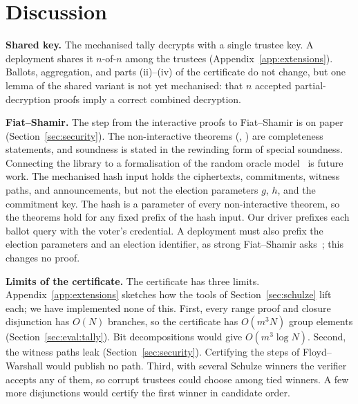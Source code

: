 \section{Discussion}\label{sec:discussion}

\textbf{Shared key.} The mechanised tally decrypts with a single trustee
key. A deployment shares it $n$-of-$n$ among the trustees
(Appendix~\ref{app:extensions}). Ballots, aggregation, and parts
(ii)--(iv) of the certificate do not change, but one lemma of the shared
variant is not yet mechanised: that $n$ accepted partial-decryption
proofs imply a correct combined decryption.

\textbf{Fiat--Shamir.} The step from the interactive proofs to
Fiat--Shamir is on paper (Section~\ref{sec:security}). The non-interactive theorems
(, ) are completeness
statements, and soundness is stated in the rewinding form of special
soundness. Connecting the library to a formalisation of the random
oracle model~\cite{10.1007/11617990_3} is future work. The mechanised
hash input holds the ciphertexts, commitments, witness paths, and
announcements, but not the election parameters $g$, $h$, and the
commitment key. The hash is a parameter of every non-interactive
theorem, so the theorems hold for any fixed prefix of the hash input.
Our driver prefixes each ballot query with the voter's credential. A
deployment must also prefix the election parameters and an election
identifier, as strong Fiat--Shamir asks~\cite{bpw12}; this changes no
proof.

\textbf{Limits of the certificate.} The certificate has three limits.
Appendix~\ref{app:extensions} sketches how the tools of
Section~\ref{sec:schulze} lift each; we have implemented none of this.
First, every range proof and closure disjunction has $O(N)$ branches, so
the certificate has $O(m^3 N)$ group elements
(Section~\ref{sec:eval:tally}). Bit decompositions would give $O(m^3
\log N)$. Second, the witness paths leak (Section~\ref{sec:security}).
Certifying the steps of Floyd--Warshall would publish no path. Third,
with several Schulze winners the verifier accepts any of them, so
corrupt trustees could choose among tied winners. A few more
disjunctions would certify the first winner in candidate order.
